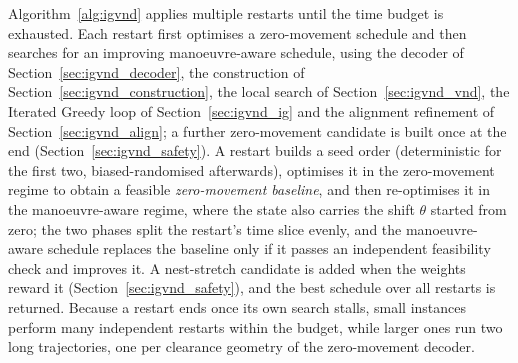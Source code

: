 Algorithm~\ref{alg:igvnd} applies multiple restarts until the time
budget is exhausted.  Each restart first optimises a zero-movement
schedule and then searches for an improving manoeuvre-aware schedule,
using the decoder of Section~\ref{sec:igvnd_decoder}, the construction of
Section~\ref{sec:igvnd_construction}, the local search of
Section~\ref{sec:igvnd_vnd}, the Iterated Greedy loop of
Section~\ref{sec:igvnd_ig} and the alignment refinement of
Section~\ref{sec:igvnd_align}; a further zero-movement candidate is built
once at the end (Section~\ref{sec:igvnd_safety}).  A restart builds a seed
order (deterministic for the first two, biased-randomised afterwards),
optimises it in the zero-movement regime to obtain a feasible
\emph{zero-movement baseline}, and then re-optimises it in the
manoeuvre-aware regime, where the state also carries the shift $\theta$
started from zero; the two phases split the restart's time slice evenly,
and the manoeuvre-aware schedule replaces the baseline only if it passes
an independent feasibility check and improves it.  A nest-stretch candidate
is added when the weights reward it (Section~\ref{sec:igvnd_safety}), and the
best schedule over all restarts is returned.  Because a restart ends
once its own search stalls, small instances perform many independent
restarts within the budget, while larger ones run two long trajectories,
one per clearance geometry of the zero-movement decoder.

